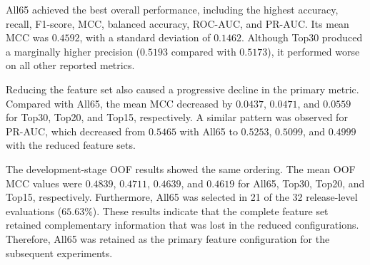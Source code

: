 \documentclass[conference]{IEEEtran}
\begin{document}
\begin{table}[H]
\caption{Feature-Set Ablation Results Across 32 Releases}
\label{tab:feature-ablation}
\centering
\setlength{\tabcolsep}{2.2pt}
\end{table}

All65 achieved the best overall performance, including the highest
accuracy, recall, F1-score, MCC, balanced accuracy, ROC-AUC, and
PR-AUC. Its mean MCC was \(0.4592\), with a standard deviation of
\(0.1462\). Although Top30 produced a marginally higher precision
(\(0.5193\) compared with \(0.5173\)), it performed worse on all other
reported metrics.

Reducing the feature set also caused a progressive decline in the
primary metric. Compared with All65, the mean MCC decreased by
\(0.0437\), \(0.0471\), and \(0.0559\) for Top30, Top20, and Top15,
respectively. A similar pattern was observed for PR-AUC, which decreased
from \(0.5465\) with All65 to \(0.5253\), \(0.5099\), and \(0.4999\)
with the reduced feature sets.

The development-stage OOF results showed the same ordering. The mean
OOF MCC values were \(0.4839\), \(0.4711\), \(0.4639\), and \(0.4619\)
for All65, Top30, Top20, and Top15, respectively. Furthermore, All65
was selected in 21 of the 32 release-level evaluations
(\(65.63\%\)). These results indicate that the complete feature set
retained complementary information that was lost in the reduced
configurations. Therefore, All65 was retained as the primary feature
configuration for the subsequent experiments.
\end{document}
